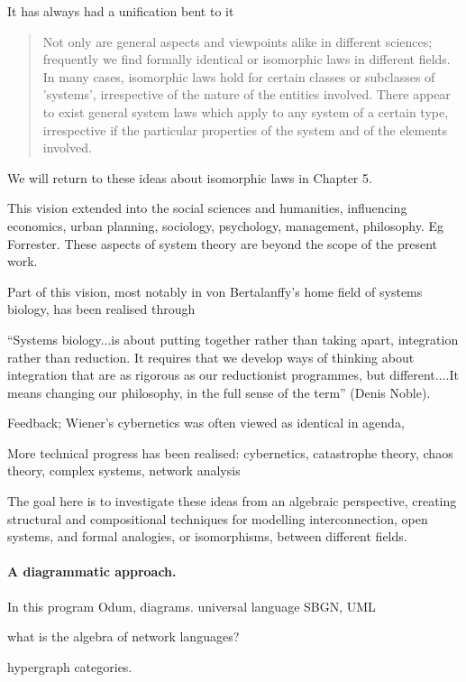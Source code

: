 It has always had a unification bent to it \cite{Ber50}

\begin{quotation}
  Not only are general aspects and viewpoints alike in different sciences;
  frequently we find formally identical or isomorphic laws in different fields.
  In many cases, isomorphic laws hold for certain classes or subclasses of
  'systems', irrespective of the nature of the entities involved. There appear
  to exist general system laws which apply to any system of a certain type,
  irrespective if the particular properties of the system and of the elements
  involved.
\end{quotation}
We will return to these ideas about isomorphic laws in Chapter 5.

This vision extended into the social sciences and humanities, influencing
economics, urban planning, sociology, psychology, management, philosophy. Eg
Forrester. These aspects of system theory are beyond the scope of the present
work.

Part of this vision, most notably in von Bertalanffy's home field of
systems biology, has been realised through 


    ``Systems biology...is about putting together rather than taking apart,
    integration rather than reduction. It requires that we develop ways of
    thinking about integration that are as rigorous as our reductionist
    programmes, but different....It means changing our philosophy, in the full
    sense of the term'' (Denis Noble).

Feedback; Wiener's cybernetics was often viewed as identical in agenda, 

More technical progress has been realised: cybernetics, catastrophe theory,
chaos theory, complex systems, network analysis

The goal here is to investigate these ideas from an algebraic perspective,
creating structural and compositional techniques for modelling
interconnection, open systems, and formal analogies, or isomorphisms, between
different fields.

\paragraph{A diagrammatic approach.}

In this program Odum, diagrams. universal language SBGN, UML

what is the algebra of network languages?

hypergraph categories.

